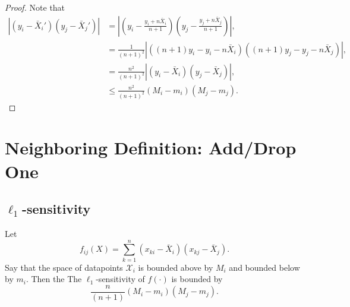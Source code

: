 \documentclass[11pt]{scrartcl} %
\begin{document}
\begin{proof}
Note that
\begin{align*}
 \left\vert (y_i - \bar{X}_i')(y_j - \bar{X}_j') \right\vert &= \left\vert \left( y_i - \frac{y_i + n \bar{X}_i}{n+1}\right) \left( y_j - \frac{y_j + n \bar{X}_j}{n+1}\right) \right\vert, \\
 	&= \frac{1}{(n+1)^2} \left\vert \left((n+1)y_i - y_i - n\bar{X}_i \right)\left((n+1)y_j - y_j - n\bar{X}_j \right) \right\vert, \\
	&= \frac{n^2}{(n+1)^2} \left\vert (y_i - \bar{X}_i)(y_j - \bar{X}_j)\right\vert, \\
	&\le \frac{n^2}{(n+1)^2} (M_i - m_i)(M_j - m_j).
\end{align*}
\end{proof}

\section{Neighboring Definition: Add/Drop One}
\subsection{$\ell_1$-sensitivity}

\begin{theorem}
Let 
$$ f_{ij} (X)= \sum_{k=1}^n (x_{ki} - \bar{X}_i)(x_{kj} - \bar{X}_j).$$
Say that the space of datapoints $\mathcal{X}_i$ is bounded above by $M_i$ and bounded below by $m_i$. Then the
The $\ell_1$-sensitivity of $f(\cdot)$ is bounded by
 $$ \frac{n}{(n+1)}  (M_i - m_i)(M_j - m_j).$$ 
\end{theorem}
\end{document}
